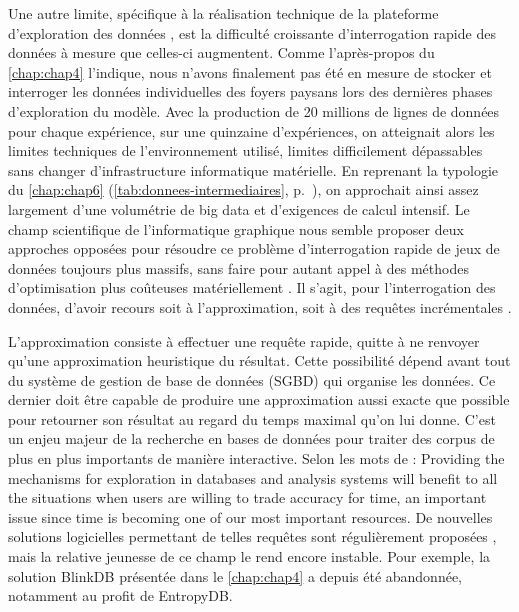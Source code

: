 Une autre limite, spécifique à la réalisation technique de la plateforme d'exploration des données \simedb{}, est la difficulté croissante d'interrogation rapide des données à mesure que celles-ci augmentent. Comme l'après-propos du \cref{chap:chap4} l'indique, nous n'avons finalement pas été en mesure de stocker et interroger les données individuelles des foyers paysans lors des dernières phases d'exploration du modèle. Avec la production de 20 millions de lignes de données pour chaque expérience, sur une quinzaine d'expériences, on atteignait alors les limites techniques de l'environnement utilisé, limites difficilement dépassables sans changer d'infrastructure informatique matérielle. En reprenant la typologie du \cref{chap:chap6} (\cref{tab:donnees-intermediaires}, p.~\pageref{tab:donnees-intermediaires}), on approchait ainsi assez largement d'une volumétrie de big data et d'exigences de calcul intensif. Le champ scientifique de l'informatique graphique nous semble proposer deux approches opposées pour résoudre ce problème d'interrogation rapide de jeux de données toujours plus massifs, sans faire pour autant appel à des méthodes d'optimisation plus coûteuses matériellement \autocite{amirpour_amraii_human-data_2018}. Il s'agit, pour l'interrogation des données, d'avoir recours soit à l'approximation, soit à des requêtes incrémentales \autocite[28--33]{amirpour_amraii_human-data_2018}.

L'approximation consiste à effectuer une requête rapide, quitte à ne renvoyer qu'une approximation heuristique du résultat. Cette possibilité dépend avant tout du système de gestion de base de données (SGBD) qui organise les données. Ce dernier doit être capable de produire une approximation aussi exacte que possible pour retourner son résultat au regard du temps maximal qu'on lui donne. C'est un enjeu majeur de la recherche en bases de données pour traiter des corpus de plus en plus importants de manière interactive. Selon les mots de \textcite[7]{fekete_visual_2013} : \og Providing the mechanisms for exploration in databases and analysis systems will benefit to all the situations when users are willing to trade accuracy for time, an important issue since time is becoming one of our most important resources\fg{}. De nouvelles solutions logicielles permettant de telles requêtes sont régulièrement proposées \autocite[par exemple EntropyDB, de ][]{orr_entropydb_2019}, mais la relative jeunesse de ce champ le rend encore instable. Pour exemple, la solution BlinkDB \autocite{agarwal_blinkdb_2013} présentée dans le \cref{chap:chap4} a depuis été abandonnée, notamment au profit de EntropyDB.

